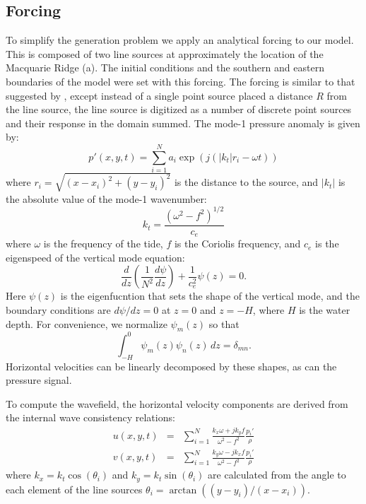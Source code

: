 \documentclass[10pt]{article}
\begin{document}
%
%
%
%
%
%
%

\subsection{Forcing}

To simplify the generation problem we apply an analytical forcing to our model.  This is composed of two line sources at approximately the location of the Macquarie Ridge (a).  The initial conditions and the southern and eastern boundaries of the model were set with this forcing.  The forcing is similar to that suggested by \citet{rainvilleetal10}, except instead of a single point source placed a distance $R$ from the line source, the line source is digitized as a number of discrete point sources and their response in the domain summed.  The mode-1 pressure anomaly is given by:
\begin{equation}
  p'(x,y,t)=\sum_{i=1}^{N}  a_i \exp\left(j\left(|k_t|r_i - \omega t\right)\right)
\end{equation}
where $r_i=\sqrt{\left(x-x_i\right)^2+\left(y-y_i\right)^2}$ is the distance to the source, and $|k_t|$ is the absolute value of the mode-1 wavenumber:
\begin{equation}
  k_t = \frac{\left(\omega^2-f^2\right)^{1/2}}{c_e}
\end{equation}
where $\omega$ is the frequency of the tide, $f$ is the Coriolis frequency, and $c_e$ is the eigenspeed of the vertical mode equation:
\begin{equation}
  \frac{d}{dz}\left(\frac{1}{N^2}\frac{d\psi}{dz}\right)
 + \frac{1}{c_e^2}\psi(z)=0.
\end{equation}
Here $\psi(z)$ is the eigenfucntion that sets the shape of the vertical mode, and the boundary conditions are $d\psi/dz=0$ at $z=0$ and $z=-H$, where $H$ is the water depth.  For convenience, we normalize $\psi_m(z)$ so that 
\begin{equation}
  \int_{-H}^0 \psi_m(z)\psi_n(z)\, dz = \delta_{mn}.
\end{equation}
Horizontal velocities can be linearly decomposed by these shapes, as can the pressure signal.  

To compute the wavefield, the horizontal velocity components are derived from the internal wave consistency relations: 
\begin{eqnarray}
  u(x,y,t) & = &\sum_{i=1}^{N}  \frac{k_x\omega + j k_y f}{\omega^2-f^2} \frac{p_i'}{\rho}\\
  v(x,y,t) &=& \sum_{i=1}^{N}  \frac{k_y\omega - j k_x f}{\omega^2-f^2} \frac{p_i'}{\rho} 
\end{eqnarray}
where $k_x=k_t\cos(\theta_i)$ and $k_y=k_t\sin(\theta_i)$ are calculated from the angle to  each element of the line sources $\theta_i = \arctan((y-y_i)/(x-x_i))$.  
\end{document}
